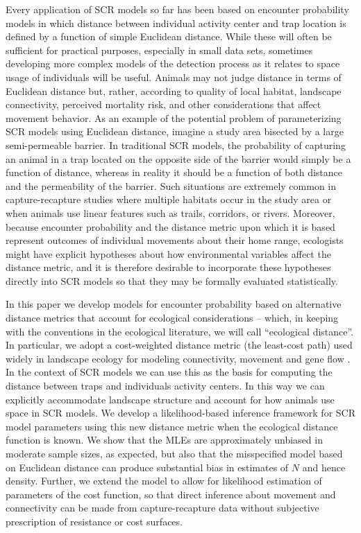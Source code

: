\documentclass[12pt]{article}
\begin{document}
\begin{spacing}{1.8}
Every application of SCR models so far has been based on encounter
probability models in which distance between individual activity
center and trap location is defined by a function of simple Euclidean
distance.  While these will often be sufficient for practical
purposes, especially in small data sets, sometimes developing more
complex models of the detection process as it relates to space usage
of individuals will be useful.  Animals may not judge distance in
terms of Euclidean distance but, rather, according to quality of local
habitat, landscape connectivity, perceived mortality risk, and other
considerations that affect movement behavior.
As an example of the potential problem of parameterizing SCR models
using Euclidean distance, imagine a study area bisected by a large
semi-permeable barrier. In traditional SCR models, the probability of
capturing an animal in a trap located on the opposite side of the
barrier would simply be a function of distance, whereas in reality it
should be a function of both distance and the permeability of the
barrier. Such situations are extremely common in capture-recapture
studies where multiple habitats occur in the study area or when
animals use linear features such as trails, corridors, or rivers.
 Moreover, because encounter probability and the distance
metric upon which it is based represent outcomes of individual
movements about their home range, ecologists might have explicit
hypotheses about how environmental variables affect the distance
metric, and it is therefore desirable to incorporate these hypotheses
directly into SCR models so that they may be formally evaluated
statistically.

In this paper we develop models for encounter probability based on
alternative distance metrics that account for ecological
considerations -- which, in keeping with the conventions in the
ecological literature, we will call ``ecological distance''. In
particular, we adopt a cost-weighted distance metric (the least-cost path)
used widely in landscape ecology for modeling connectivity,
movement and gene flow
\citep{adriaensen_etal:2003}. In the
context of SCR models we can use this as the basis for computing the
distance between traps and individuals activity centers. In this way
we can explicitly accommodate landscape structure and
account for how animals use space in SCR models. We develop a
likelihood-based inference framework for SCR model parameters using
this new distance metric when the ecological distance function is
known.  We show that the MLEs are approximately unbiased in moderate
sample sizes, as expected, but also that the misspecified model based
on Euclidean distance can produce substantial bias in estimates of $N$
and hence density.  Further, we extend the model to allow for likelihood
estimation of parameters of the cost function, so that direct inference
about movement and connectivity can be made from capture-recapture data without subjective prescription
of resistance or cost surfaces.



\end{spacing}
\end{document}

